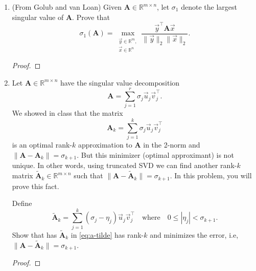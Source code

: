 \documentclass{article}
\theoremstyle{definition}
\newtheorem*{answer}{Answer}
\newcommand{\reals} {\mathbb{R}}
\newcommand{\mat}[1]{\bm{#1}}
\begin{document}
\begin{enumerate}[leftmargin=\labelsep]
\begin{enumerate}
\begin{answer}
		            \end{answer}

		      \item Form the optimal rank-1 approximation \(\mat{A}_1\) to \(\mat{A}\) in the 2-norm? What is the error matrix \(\mat{A} - \mat{A}_1\), and what is the norm of the error \(\|\mat{A} - \mat{A}_1\|_2\)? The error matrix and the norm of the error follow directly from the SVD; no computation is needed.
		            \begin{answer}

		            \end{answer}
	      \end{enumerate}

	\item (From Golub and van Loan) Given \(\mat{A} \in \reals^{m \times n}\), let \(\sigma_1\) denote the largest singular value of \(\mat{A}\). Prove that
	      \[
		      \sigma_1(\mat{A}) = \max_{\substack{\vec{y} \in \reals^m, \\ \vec{x} \in \reals^n}} \frac{\vec{y}^\top \mat{A} \vec{x}}{\|\vec{y}\|_2\|\vec{x}\|_2}.
	      \]
	      \begin{proof}

	      \end{proof}

	\item Let \(\mat{A} \in \reals^{m \times n}\) have the singular value decomposition
	      \[
		      \mat{A} = \sum_{j = 1}^r \sigma_j \vec{u}_j\vec{v}_j^\top.
	      \]
	      We showed in class that the matrix
	      \[
		      \mat{A}_k = \sum_{j = 1}^k \sigma_j \vec{u}_j\vec{v}_j^\top
	      \]
	      is an optimal rank-\(k\) approximation to \(\mat{A}\) in the 2-norm and \(\|\mat{A} - \mat{A}_k\| = \sigma_{k+1}\). But this minimizer (optimal approximant) is not unique. In other words, using truncated SVD we can find another rank-\(k\) matrix \(\tilde{\mat{A}}_k \in \reals^{m\times n}\) such that \(\|\mat{A} - \tilde{\mat{A}}_k\| = \sigma_{k+1}\). In this problem, you will prove this fact.

	      Define
	      \begin{equation}
		      \tilde{\mat{A}}_k = \sum_{j = 1}^k(\sigma_j - \eta_j)\vec{u}_j\vec{v}_j^\top \quad \text{where} \quad 0 \leq |\eta_j| < \sigma_{k + 1}. \label{eq:a-tilde}
	      \end{equation}
	      Show that has \(\tilde{\mat{A}}_k\) in \eqref{eq:a-tilde} has rank-\(k\) and minimizes the error, i.e, \(\|\mat{A} - \tilde{\mat{A}}_k\| = \sigma_{k+1}\).
	      \begin{proof}


\end{proof}
\end{enumerate}
\end{document}
